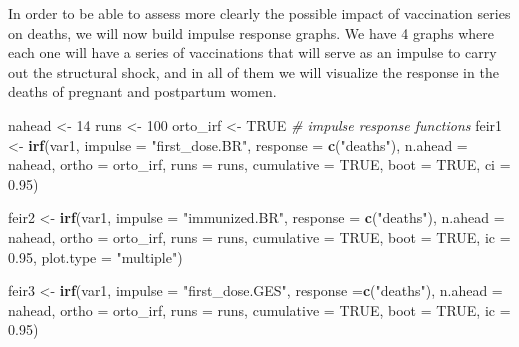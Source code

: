 \documentclass[
]{article}
\newenvironment{Shaded}{\begin{snugshade}}{\end{snugshade}}
\newcommand{\AttributeTok}[1]{\textcolor[rgb]{0.13,0.29,0.53}{#1}}
\newcommand{\CommentTok}[1]{\textcolor[rgb]{0.56,0.35,0.01}{\textit{#1}}}
\newcommand{\ConstantTok}[1]{\textcolor[rgb]{0.56,0.35,0.01}{#1}}
\newcommand{\DecValTok}[1]{\textcolor[rgb]{0.00,0.00,0.81}{#1}}
\newcommand{\FloatTok}[1]{\textcolor[rgb]{0.00,0.00,0.81}{#1}}
\newcommand{\FunctionTok}[1]{\textcolor[rgb]{0.13,0.29,0.53}{\textbf{#1}}}
\newcommand{\NormalTok}[1]{#1}
\newcommand{\OtherTok}[1]{\textcolor[rgb]{0.56,0.35,0.01}{#1}}
\newcommand{\StringTok}[1]{\textcolor[rgb]{0.31,0.60,0.02}{#1}}
\renewenvironment{Shaded}{\begin{mdframed}[ backgroundcolor=shadecolor, linecolor = shadecolor, leftmargin=\dimexpr\leftmargin-2pt\relax, innerleftmargin=1.6pt, innertopmargin=5pt, skipabove=10pt,skipbelow=3pt ]}{\end{mdframed}}
\begin{document}
In order to be able to assess more clearly the possible impact of
vaccination series on deaths, we will now build impulse response graphs.
We have 4 graphs where each one will have a series of vaccinations that
will serve as an impulse to carry out the structural shock, and in all
of them we will visualize the response in the deaths of pregnant and
postpartum women.

\begin{Shaded}
\begin{Highlighting}[]
\NormalTok{nahead }\OtherTok{\textless{}{-}} \DecValTok{14}
\NormalTok{runs }\OtherTok{\textless{}{-}} \DecValTok{100}
\NormalTok{orto\_irf }\OtherTok{\textless{}{-}} \ConstantTok{TRUE}
\CommentTok{\# impulse response functions}
\NormalTok{feir1 }\OtherTok{\textless{}{-}} \FunctionTok{irf}\NormalTok{(var1,}
             \AttributeTok{impulse =} \StringTok{"first\_dose.BR"}\NormalTok{,}
             \AttributeTok{response =} \FunctionTok{c}\NormalTok{(}\StringTok{"deaths"}\NormalTok{),}
             \AttributeTok{n.ahead =}\NormalTok{ nahead,}
             \AttributeTok{ortho =}\NormalTok{ orto\_irf,}
             \AttributeTok{runs =}\NormalTok{ runs,}
             \AttributeTok{cumulative =} \ConstantTok{TRUE}\NormalTok{,}
             \AttributeTok{boot =} \ConstantTok{TRUE}\NormalTok{, }
             \AttributeTok{ci =} \FloatTok{0.95}\NormalTok{)}

\NormalTok{feir2 }\OtherTok{\textless{}{-}} \FunctionTok{irf}\NormalTok{(var1,}
             \AttributeTok{impulse =} \StringTok{"immunized.BR"}\NormalTok{,}
             \AttributeTok{response =} \FunctionTok{c}\NormalTok{(}\StringTok{"deaths"}\NormalTok{),}
             \AttributeTok{n.ahead =}\NormalTok{ nahead,}
             \AttributeTok{ortho =}\NormalTok{ orto\_irf,}
             \AttributeTok{runs =}\NormalTok{ runs,}
             \AttributeTok{cumulative =} \ConstantTok{TRUE}\NormalTok{,}
             \AttributeTok{boot =} \ConstantTok{TRUE}\NormalTok{,}
             \AttributeTok{ic =} \FloatTok{0.95}\NormalTok{,}
             \AttributeTok{plot.type =} \StringTok{"multiple"}\NormalTok{)}

\NormalTok{feir3 }\OtherTok{\textless{}{-}} \FunctionTok{irf}\NormalTok{(var1,}
             \AttributeTok{impulse =} \StringTok{"first\_dose.GES"}\NormalTok{,}
             \AttributeTok{response =}\FunctionTok{c}\NormalTok{(}\StringTok{"deaths"}\NormalTok{),}
             \AttributeTok{n.ahead =}\NormalTok{ nahead,}
             \AttributeTok{ortho =}\NormalTok{ orto\_irf,}
             \AttributeTok{runs =}\NormalTok{ runs,}
             \AttributeTok{cumulative =} \ConstantTok{TRUE}\NormalTok{,}
             \AttributeTok{boot =} \ConstantTok{TRUE}\NormalTok{,}
             \AttributeTok{ic =} \FloatTok{0.95}\NormalTok{)}


\end{Highlighting}
\end{Shaded}
\end{document}
